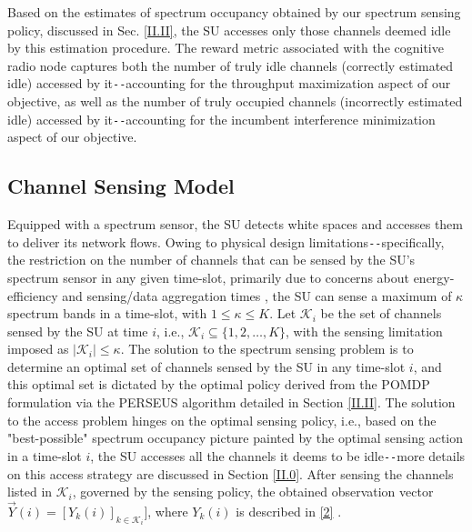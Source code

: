 \documentclass[12pt, draftcls, onecolumn]{IEEEtran}
\begin{document}
Based on the estimates of spectrum occupancy obtained by our spectrum sensing policy, discussed in Sec. \ref{II.II}, the SU accesses only those channels deemed idle by this estimation procedure. The reward metric associated with the cognitive radio node captures both the number of truly idle channels (correctly estimated idle) accessed by it\texttt{-{}-}accounting for the throughput maximization aspect of our objective, as well as the number of truly occupied channels (incorrectly estimated idle) accessed by it\texttt{-{}-}accounting for the incumbent interference minimization aspect of our objective.

\subsection{Channel Sensing Model}\label{I.III}
Equipped with a spectrum sensor, the SU detects white spaces and accesses them to deliver its network flows. Owing to physical design limitations\texttt{-{}-}specifically, the restriction on the number of channels that can be sensed by the SU's spectrum sensor in any given time-slot, primarily due to concerns about energy-efficiency and sensing/data aggregation times \cite{WCL:3}, the SU can sense a maximum of $\kappa$ spectrum bands in a time-slot, with $1{\leq}\kappa{\leq}K$. Let $\mathcal{K}_{i}$ be the set of channels sensed by the SU at time $i$, i.e., $\mathcal{K}_{i}{\subseteq}\{1,2,\dots,K\}$, with the sensing limitation imposed as $|\mathcal{K}_{i}|{\leq}\kappa$. The solution to the spectrum sensing problem is to determine an optimal set of channels sensed by the SU in any time-slot $i$, and this optimal set is dictated by the optimal policy derived from the POMDP formulation via the PERSEUS algorithm detailed in Section \ref{II.II}. The solution to the access problem hinges on the optimal sensing policy, i.e., based on the "best-possible" spectrum occupancy picture painted by the optimal sensing action in a time-slot $i$, the SU accesses all the channels it deems to be idle\texttt{-{}-}more details on this access strategy are discussed in Section \ref{II.0}. After sensing the channels listed in $\mathcal{K}_{i}$, governed by the sensing policy, the obtained observation vector $\vec{Y}(i){=}[Y_{k}(i)]_{k{\in}\mathcal{K}_{i}}]$, where $Y_{k}(i)$ is described in \eqref{2} .
\end{document}
